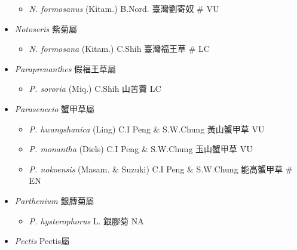 \begin{itemize}
  \begin{itemize}
        \item[] \textit{N. formosanus} (Kitam.) B.Nord.  臺灣劉寄奴  \# VU
  \end{itemize}
 \item[] \textit{Notoseris} 紫菊屬
                                
  \begin{itemize}
        \item[] \textit{N. formosana} (Kitam.) C.Shih  臺灣福王草  \# LC
  \end{itemize}
 \item[] \textit{Paraprenanthes} 假福王草屬
                                
  \begin{itemize}
        \item[] \textit{P. sororia} (Miq.) C.Shih  山苦藚   LC
  \end{itemize}
 \item[] \textit{Parasenecio} 蟹甲草屬
                                
  \begin{itemize}
        \item[] \textit{P. hwangshanica} (Ling) C.I Peng \& S.W.Chung  黃山蟹甲草   VU
        \item[] \textit{P. monantha} (Diels) C.I Peng \& S.W.Chung  玉山蟹甲草   VU
        \item[] \textit{P. nokoensis} (Masam. \& Suzuki) C.I Peng \& S.W.Chung  能高蟹甲草  \# EN
  \end{itemize}
 \item[] \textit{Parthenium} 銀膞菊屬
                                
  \begin{itemize}
        \item[] \textit{P. hysterophorus} L.  銀膠菊   NA
  \end{itemize}
 \item[] \textit{Pectis} Pectis屬
                                

\end{itemize}
